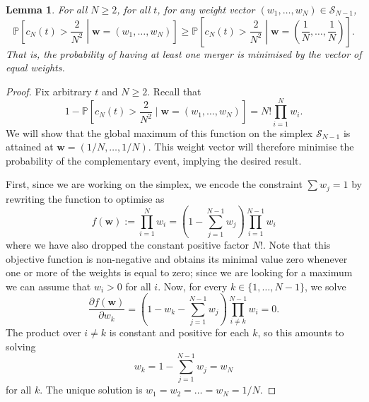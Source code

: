 \documentclass{article}
\newtheorem{lemma}{Lemma}
\newcommand{\PR}{\mathbb{P}}
\newcommand{\1}[1]{\mathbb{I}_{#1}}
\begin{document}
\begin{lemma}\label{lem:mn_optimal_w}
For all $N\geq 2$, for all $t$, for any weight vector $(w_1, \dots, w_N) \in \mathcal{S}_{N-1}$,
\begin{equation*}
\PR \left[c_N(t) > \frac{2}{N^2} \middle| \mathbf{w}=(w_1, \dots, w_N) \right]
\geq \PR \left[c_N(t) > \frac{2}{N^2} \middle| \mathbf{w}=\left( \frac{1}{N}, \dots, \frac{1}{N} \right) \right] .
\end{equation*}
That is, the probability of having at least one merger is minimised by the vector of equal weights.
\end{lemma}

\begin{proof}
Fix arbitrary $t$ and $N\geq 2$. Recall that
\begin{equation}\label{eq:mn_nomerger_prob}
1-\PR \left[c_N(t) > \frac{2}{N^2} \mid \mathbf{w}=(w_1, \dots, w_N) \right]
= N! \prod_{i=1}^N w_i .
\end{equation}
We will show that the global maximum of this function on the simplex $\mathcal{S}_{N-1}$ is attained at $\mathbf{w}=(1/N,\dots,1/N)$.
This weight vector will therefore minimise the probability of the complementary event, implying the desired result.

First, since we are working on the simplex, we encode the constraint $\sum w_j =1$ by rewriting the function to optimise as
\begin{equation*}
f(\mathbf{w}) :=
\prod_{i=1}^N w_i
= \left(1- \sum_{j=1}^{N-1} w_j \right)\prod_{i=1}^{N-1} w_i 
\end{equation*}
where we have also dropped the constant positive factor $N!$. Note that this objective function is non-negative and obtains its minimal value zero whenever one or more of the weights is equal to zero; since we are looking for a maximum we can assume that $w_i >0$ for all $i$.
Now, for every $k \in \{1,\dots,N-1\}$, we solve
\begin{equation*}
\frac{\partial f(\mathbf{w})}{\partial w_k}
= \left(1- w_k - \sum_{j=1}^{N-1} w_j \right)\prod_{i\neq k}^{N-1} w_i 
=0 .
\end{equation*}
The product over $i \neq k$ is constant and positive for each $k$, so this amounts to solving
\begin{equation*}
w_k = 1- \sum_{j=1}^{N-1} w_j = w_N
\end{equation*}
for all $k$.
The unique solution is
$w_1 = w_2= \dots =  w_N = 1/N$.


\end{proof}
\end{document}

